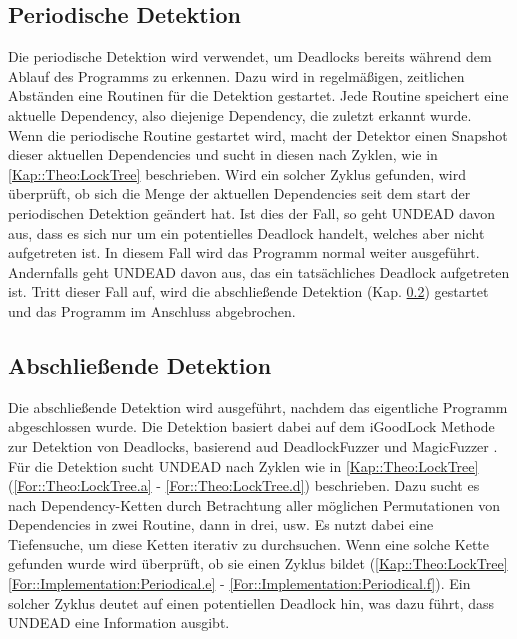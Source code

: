 \subsection{Periodische Detektion}
Die periodische Detektion wird verwendet, um Deadlocks bereits während dem 
Ablauf des Programms zu erkennen. Dazu wird in regelmäßigen, zeitlichen 
Abständen eine Routinen für die Detektion gestartet. Jede Routine speichert eine 
aktuelle Dependency, also diejenige Dependency, die zuletzt erkannt wurde.\\
Wenn die periodische Routine gestartet wird, macht der Detektor einen Snapshot
dieser aktuellen Dependencies und sucht in diesen nach Zyklen, wie in 
\ref{Kap::Theo:LockTree} beschrieben. Wird ein solcher Zyklus gefunden, wird 
überprüft, ob sich die Menge der aktuellen Dependencies seit dem start der 
periodischen Detektion geändert hat. Ist dies der Fall, so geht UNDEAD davon aus,
dass es sich nur um ein potentielles Deadlock handelt, welches aber nicht 
aufgetreten ist. In diesem Fall wird das Programm normal weiter ausgeführt.
Andernfalls geht UNDEAD davon aus, das ein tatsächliches Deadlock aufgetreten 
ist. Tritt dieser Fall auf, wird die 
abschließende Detektion (Kap. \ref{Kap::UNDEAD:Abschließende}) gestartet 
und das Programm im Anschluss abgebrochen. 
\subsection{Abschließende Detektion} \label{Kap::UNDEAD:Abschließende}
Die abschließende Detektion wird ausgeführt, nachdem das eigentliche Programm
abgeschlossen wurde. Die Detektion basiert dabei auf dem iGoodLock Methode 
zur Detektion von Deadlocks, basierend aud DeadlockFuzzer \cite{Joshi} und 
MagicFuzzer \cite{Cai}. Für die Detektion sucht UNDEAD nach Zyklen wie in 
\ref{Kap::Theo:LockTree} (\eqref{For::Theo:LockTree.a} - \eqref{For::Theo:LockTree.d})
beschrieben. Dazu sucht es nach Dependency-Ketten 
durch Betrachtung aller möglichen Permutationen von Dependencies in zwei Routine, dann 
in drei, usw. Es nutzt dabei 
eine Tiefensuche, um diese Ketten iterativ zu durchsuchen. Wenn eine solche Kette 
gefunden wurde wird überprüft, ob sie einen Zyklus bildet (\ref{Kap::Theo:LockTree} 
\eqref{For::Implementation:Periodical.e} - \eqref{For::Implementation:Periodical.f}).
Ein solcher Zyklus deutet auf einen potentiellen Deadlock hin, was dazu 
führt, dass UNDEAD eine Information ausgibt.


